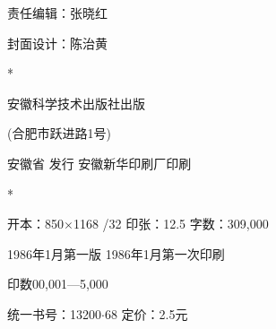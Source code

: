 \begin{center}
  \fangsong\mbox{}

  \mbox{}\label{publish}

  责任编辑：张晓红

  封面设计：陈治黄

  \vfill \heiti{}

  \normalsize {}

  \normalfont{} *

  安徽科学技术出版社出版

   (合肥市跃进路1号)

  \normalsize 安徽省%
  \hspace{0.2em}\hspace{0.2em}%
  发行 \quad 安徽新华印刷厂印刷

  *

  开本：850$\times$1168 /32 \quad 印张：12.5 \quad 字数：309,000

  1986年1月第一版 \qquad 1986年1月第一次印刷

  印数00,001—5,000

  \normalsize 统一书号：13200$\cdot$68 \qquad 定价：2.5元
\end{center}
\thispagestyle{empty}
\clearpage

